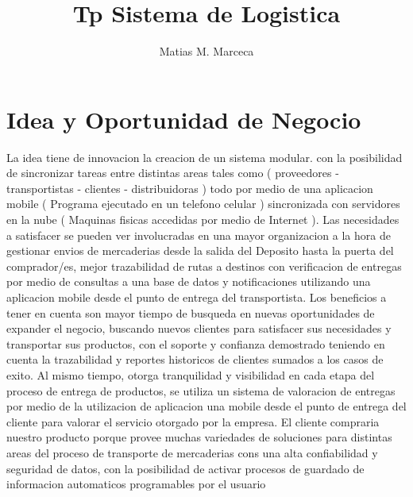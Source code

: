 \documentclass[
10pt, %
a4paper, %
oneside, %
headinclude,footinclude, %
BCOR5mm, %
]{scrartcl}
\title{Tp Sistema de Logistica}
\author{Matias M. Marceca}
\date{}
\begin{document}
\maketitle

\tableofcontents

\pagebreak

\section{Idea y Oportunidad de Negocio}

La idea tiene de innovacion la creacion de un sistema modular.
con la posibilidad de sincronizar tareas entre distintas areas
tales como ( proveedores - transportistas - clientes - distribuidoras )
todo por medio de una aplicacion mobile ( Programa ejecutado en un telefono
celular ) sincronizada con servidores en la nube ( Maquinas fisicas accedidas
por medio de Internet ).
\newline\newline
Las necesidades a satisfacer se pueden ver involucradas en una  mayor
organizacion a la hora de gestionar envios de mercaderias desde la salida
del Deposito hasta la puerta del comprador/es,  mejor trazabilidad de
rutas a destinos con verificacion de entregas por medio de consultas a una
base de datos y notificaciones utilizando una aplicacion mobile desde el
punto de entrega del transportista.
\newline\newline
Los beneficios a tener en cuenta son mayor tiempo de busqueda en nuevas
oportunidades de expander el negocio, buscando nuevos clientes para satisfacer
sus necesidades y transportar sus productos, con el soporte y confianza demostrado
teniendo en cuenta la trazabilidad y reportes historicos de clientes sumados
a los casos de exito.
\newline\newline
Al mismo tiempo, otorga tranquilidad y visibilidad en cada etapa del
proceso de entrega de productos, se utiliza un sistema de valoracion de
entregas por medio de la utilizacion de aplicacion una mobile desde el
punto de entrega del cliente para valorar el servicio otorgado por la empresa.
\newline\newline
El cliente compraria nuestro producto porque provee muchas variedades de
soluciones para distintas areas del proceso de transporte de mercaderias cons
una alta confiabilidad y seguridad de datos, con la posibilidad de activar
procesos de guardado de informacion automaticos programables por el usuario
\end{document}
